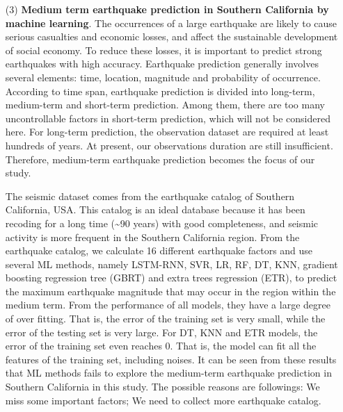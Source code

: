 \begin{enumerate}
  \item[(3)] \textbf{Medium term earthquake prediction in Southern California by machine learning}. The occurrences of a large earthquake are likely to cause serious casualties and economic losses, and affect the sustainable development of social economy. To reduce these losses, it is important to predict strong earthquakes with high accuracy. Earthquake prediction generally involves several elements: time, location, magnitude and probability of occurrence. According to time span, earthquake prediction is divided into long-term, medium-term and short-term prediction. Among them, there are too many uncontrollable factors in short-term prediction, which will not be considered here. For long-term prediction, the observation dataset are required at least hundreds of years. At present, our observations duration are still insufficient. Therefore, medium-term earthquake prediction becomes the focus of our study.

  The seismic dataset comes from the earthquake catalog of Southern California, USA. This catalog is an ideal database because it has been recoding for a long time (\sim 90 years) with good completeness, and seismic activity is more frequent in the Southern California region. From the earthquake catalog, we calculate 16 different earthquake factors and use several ML methods, namely LSTM-RNN, SVR, LR, RF, DT, KNN, gradient boosting regression tree (GBRT) and extra trees regression (ETR), to predict the maximum earthquake magnitude that may occur in the region within the medium term. From the performance of all models, they have a large degree of over fitting. That is, the error of the training set is very small, while the error of the testing set is very large. For DT, KNN and ETR models, the error of the training set even reaches 0. That is, the model can fit all the features of the training set, including noises. It can be seen from these results that ML methods fails to explore the medium-term earthquake prediction in Southern California in this study. The possible reasons are followings: We miss some important factors; We need to collect more earthquake catalog.

\end{enumerate}
